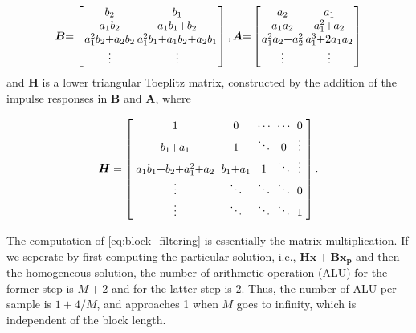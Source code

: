 \begin{equation*}
    \begin{aligned}
          \bm{B} {=} \left[\arraycolsep=1.0pt\def\arraystretch{1.0}
            \begin{array}{cc}
        b_2 & b_1 \\ 
        a_1b_2 & a_1b_1{+}b_2 \\
        a_1^2b_2{+}a_2b_2 & a_1^2b_1{+}a_1b_2{+}a_2b_1 \\
        \vdots & \vdots \\
        \end{array}\right], 
        \bm{A} {=} \left[\arraycolsep=1.0pt\def\arraystretch{1.0}
            \begin{array}{cc} 
            a_2 & a_1 \\ 
            a_1a_2 & a_1^2{+}a_2 \\
            a_1^2a_2{+}a_2^2 & a_1^3{+}2a_1a_2 \\
            \vdots & \vdots \\
            \end{array}\right]
        \end{aligned}
\end{equation*}
and $\bm{H}$ is a lower triangular Toeplitz matrix, constructed by the addition of the impulse responses in $\bm{B}$ and $\bm{A}$, where

\begin{equation*}
        \bm{H} = \left[\arraycolsep=3.0pt\def\arraystretch{1.2}
            \begin{array}{ccccc}
            1 & 0 & \cdots & \cdots & 0 \\ 
            b_1{+}a_1 & 1 & \ddots & 0  & \vdots \\
            a_1b_1{+}b_2{+}a_1^2{+}a_2 & b_1{+}a_1 & 1 & \ddots & \vdots \\
            \vdots & \ddots & \ddots & \ddots & 0 \\
            \vdots & \ddots & \ddots & \ddots & 1 \\
            \end{array}\right].  \\
\end{equation*}

The computation of \eqref{eq:block_filtering} is essentially the matrix multiplication.
If we seperate by first computing the particular solution, 
i.e., $\bm{H}\bm{x}+\bm{B}\bm{x_p}$ and then the homogeneous solution,
the number of arithmetic operation (ALU) for the former step is $M{+}2$ and for the latter step is 2.
Thus, the number of ALU per sample is $1{+}4/M$, and approaches 1 when $M$ goes to infinity, which is independent
of the block length.


